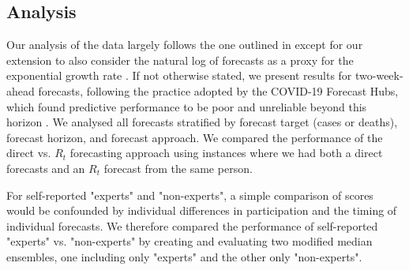 \documentclass[10pt,a4paper,twocolumn]{article}
\begin{document}
\subsection*{Analysis}
\label{sec:analysis}

Our analysis of the data largely follows the one outlined in \citet{bosseComparingHumanModelbased2022} except for our extension to also consider the natural log of forecasts as a proxy for the exponential growth rate \citet{bosseTransformationForecastsEvaluating2023}. If not otherwise stated, we present results for two-week-ahead forecasts, following the practice adopted by the COVID-19 Forecast Hubs, which found predictive performance to be poor and unreliable beyond this horizon \cite{cramerEvaluationIndividualEnsemble2021, sherrattPredictivePerformanceMultimodel2022a, bracherShorttermForecastingCOVID192021}. We analysed all forecasts stratified by forecast target (cases or deaths), forecast horizon, and forecast approach. We compared the performance of the direct vs. $R_t$ forecasting approach using instances where we had both a direct forecasts and an $R_t$ forecast from the same person. 

For self-reported "experts" and "non-experts", a simple comparison of scores would be confounded by individual differences in participation and the timing of individual forecasts. We therefore compared the performance of self-reported "experts" vs. "non-experts" by creating and evaluating two modified median ensembles, one including only "experts" and the other only "non-experts".

\end{document}
